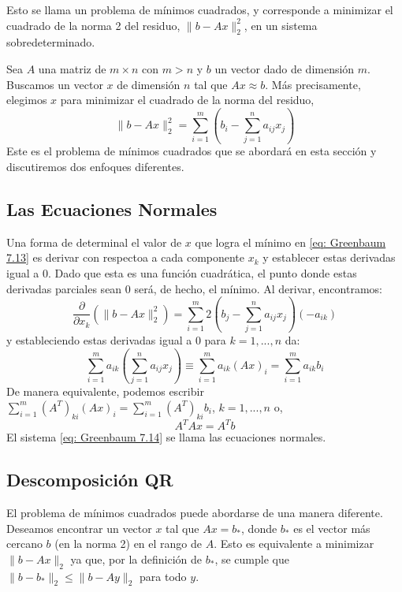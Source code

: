 Esto se llama un problema de mínimos cuadrados, y corresponde a minimizar el cuadrado de la norma 2 del residuo, $\| b - Ax \|_2^2$, en un sistema sobredeterminado.

Sea $A$ una matriz de $m \times n$ con $m > n$ y $b$ un vector dado de dimensión $m$. Buscamos un vector $x$ de dimensión $n$ tal que $Ax \approx b$. Más precisamente, elegimos $x$ para minimizar el cuadrado de la norma del residuo,
\begin{equation}
    \label{eq: Greenbaum 7.13}
    \| b - Ax \|_2^2 = \sum_{i = 1}^{m} \left( b_i - \sum_{j = 1}^{n} a_{ij} x_j \right)
\end{equation}
Este es el problema de mínimos cuadrados que se abordará en esta sección y discutiremos dos enfoques diferentes.

\subsection{Las Ecuaciones Normales}
Una forma de determinal el valor de $x$ que logra el mínimo en \ref{eq: Greenbaum 7.13} es derivar con respectoa a cada componente $x_k$ y establecer estas derivadas igual a 0. Dado que esta es una función cuadrática, el punto donde estas derivadas parciales sean 0 será, de hecho, el mínimo. Al derivar, encontramos:
\[ \frac{\partial}{\partial x_k}(\|b - Ax\|_2^2) = \sum_{i=1}^{m} 2 \left( b_j - \sum_{j = 1}^{n} a_{ij} x_j \right) (-a_{ik}) \]
y estableciendo estas derivadas igual a 0 para $k = 1,...,n$ da:
\[ \sum_{i = 1}^{m} a_{ik} \left( \sum_{j = 1}^{n} a_{ij} x_j \right) \equiv \sum_{i = 1}^{m} a_{ik}(Ax)_i = \sum_{i = 1}^{m} a_{ik} b_i \]
De manera equivalente, podemos escribir $\sum_{i = 1}^{m} (A^T)_{ki} (Ax)_i = \sum_{i=1}^{m} (A^T)_{ki} b_i$, $k = 1,...,n$ o,
\begin{equation}
    \label{eq: Greenbaum 7.14}
    A^TAx = A^Tb
\end{equation}
El sistema \ref{eq: Greenbaum 7.14} se llama las ecuaciones normales.

\subsection{Descomposición QR}
El problema de mínimos cuadrados puede abordarse de una manera diferente. Deseamos encontrar un vector $x$ tal que $Ax = b_*$, donde $b_*$ es el vector más cercano $b$ (en la norma 2) en el rango de $A$. Esto es equivalente a minimizar $\| b - Ax \|_2$ ya que, por la definición de $b_*$, se cumple que $\|b - b_*\|_2 \leq \|b - Ay\|_2$ para todo $y$.

